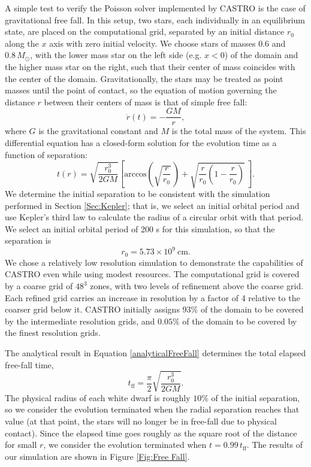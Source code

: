 \documentclass[12pt,preprint]{aastex}
\begin{document}
A simple test to verify the Poisson solver implemented by CASTRO is the case of gravitational free fall. In this setup, two stars, each individually in an equilibrium state, are placed on the computational grid, separated by an initial distance $r_0$ along the $x$ axis with zero initial velocity. We choose stars of masses $0.6$ and $0.8\, M_\odot$, with the lower mass star on the left side (e.g. $x < 0$) of the domain and the higher mass star on the right, such that their center of mass coincides with the center of the domain. Gravitationally, the stars may be treated as point masses until the point of contact, so the equation of motion governing the distance $r$ between their centers of mass is that of simple free fall:
\begin{equation}
  \ddot{r}(t) = - \frac{GM}{r},
\end{equation}
where $G$ is the gravitational constant and $M$ is the total mass of the system. This differential equation has a closed-form solution for the evolution time as a function of separation:
\begin{equation}
  t(r) = \sqrt{\frac{r_0^3}{2GM}} \left[ \text{arccos}\left(\sqrt{\frac{r}{r_0}}\,\right) + \sqrt{\frac{r}{r_0} \left(1 - \frac{r}{r_0}\right)}\ \right]. \label{analyticalFreeFall}
\end{equation}
We determine the initial separation to be consistent with the simulation performed in Section \ref{Sec:Kepler}; that is, we select an initial orbital period and use Kepler's third law to calculate the radius of a circular orbit with that period. We select an initial orbital period of 200 s for this simulation, so that the separation is
\[
  r_0 = 5.73 \times 10^{9}\ \text{cm}.
\]
We chose a relatively low resolution simulation to demonstrate the capabilities of CASTRO even while using modest resources. The computational grid is covered by a coarse grid of $48^3$ zones, with two levels of refinement above the coarse grid. Each refined grid carries an increase in resolution by a factor of 4 relative to the coarser grid below it. CASTRO initially assigns $93\%$ of the domain to be covered by the intermediate resolution grids, and $0.05\%$ of the domain to be covered by the finest resolution grids.

The analytical result in Equation \ref{analyticalFreeFall} determines the total elapsed free-fall time,
\[
  t_{\text{ff}} = \frac{\pi}{2} \sqrt{\frac{r_0^3}{2GM}}.
\]
The physical radius of each white dwarf is roughly $10\%$ of the initial separation, so we consider the evolution terminated when the radial separation reaches that value (at that point, the stars will no longer be in free-fall due to physical contact). Since the elapsed time goes roughly as the square root of the distance for small $r$, we consider the evolution terminated when $t = 0.99\, t_{\text{ff}}$. The results of our simulation are shown in Figure \ref{Fig:Free Fall}.
\end{document}
